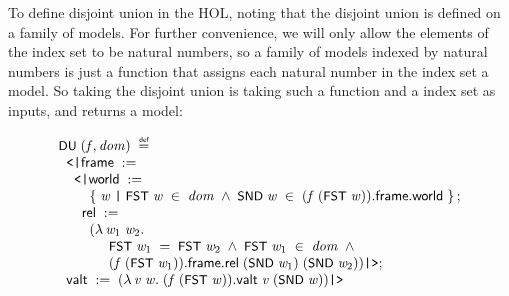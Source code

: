 \documentclass[letterpaper]{article}
\renewcommand{\HOLConst}[1]{{\textsf{\upshape\small #1}}}
\newenvironment{holmath}{\begin{displaymath}\begin{array}{l}}{\end{array}\end{displaymath}\ignorespacesafterend}
\begin{document}
To define disjoint union in the HOL, noting that the disjoint union is defined on a family of models. For further convenience, we will only allow the elements of the index set to be natural numbers, so a family of models indexed by natural numbers is just a function that assigns each natural number in the index set a model. So taking the disjoint union is taking such a function and a index set as inputs, and returns a model:

\begin{holmath}
  \HOLConst{DU}\;(\HOLFreeVar{f}\HOLSymConst{,}\HOLFreeVar{dom})\;\HOLSymConst{\HOLTokenDefEquality{}}\\
\;\;\HOLTokenLeftrec{}\HOLFieldName{frame}\;:=\\
\;\;\;\;\HOLTokenLeftrec{}\HOLFieldName{world}\;:=\\
\;\;\;\;\;\;\;\;\HOLTokenLeftbrace{}\HOLBoundVar{w}\;\HOLTokenBar{}\;\HOLConst{FST}\;\HOLBoundVar{w}\;\HOLSymConst{\HOLTokenIn{}}\;\HOLFreeVar{dom}\;\HOLSymConst{\HOLTokenConj{}}\;\HOLConst{SND}\;\HOLBoundVar{w}\;\HOLSymConst{\HOLTokenIn{}}\;(\HOLFreeVar{f}\;(\HOLConst{FST}\;\HOLBoundVar{w})).\HOLFieldName{frame}.\HOLFieldName{world}\HOLTokenRightbrace{};\\
\;\;\;\;\;\;\HOLFieldName{rel}\;:=\\
\;\;\;\;\;\;\;\;(\HOLTokenLambda{}\HOLBoundVar{w\sb{\mathrm{1}}}\;\HOLBoundVar{w\sb{\mathrm{2}}}.\\
\;\;\;\;\;\;\;\;\;\;\;\;\;\HOLConst{FST}\;\HOLBoundVar{w\sb{\mathrm{1}}}\;\HOLSymConst{=}\;\HOLConst{FST}\;\HOLBoundVar{w\sb{\mathrm{2}}}\;\HOLSymConst{\HOLTokenConj{}}\;\HOLConst{FST}\;\HOLBoundVar{w\sb{\mathrm{1}}}\;\HOLSymConst{\HOLTokenIn{}}\;\HOLFreeVar{dom}\;\HOLSymConst{\HOLTokenConj{}}\\
\;\;\;\;\;\;\;\;\;\;\;\;\;(\HOLFreeVar{f}\;(\HOLConst{FST}\;\HOLBoundVar{w\sb{\mathrm{1}}})).\HOLFieldName{frame}.\HOLFieldName{rel}\;(\HOLConst{SND}\;\HOLBoundVar{w\sb{\mathrm{1}}})\;(\HOLConst{SND}\;\HOLBoundVar{w\sb{\mathrm{2}}}))\HOLTokenRightrec{};\\
\;\;\HOLFieldName{valt}\;:=\;(\HOLTokenLambda{}\HOLBoundVar{v}\;\HOLBoundVar{w}.\;(\HOLFreeVar{f}\;(\HOLConst{FST}\;\HOLBoundVar{w})).\HOLFieldName{valt}\;\HOLBoundVar{v}\;(\HOLConst{SND}\;\HOLBoundVar{w}))\HOLTokenRightrec{}
\end{holmath}
\end{document}
